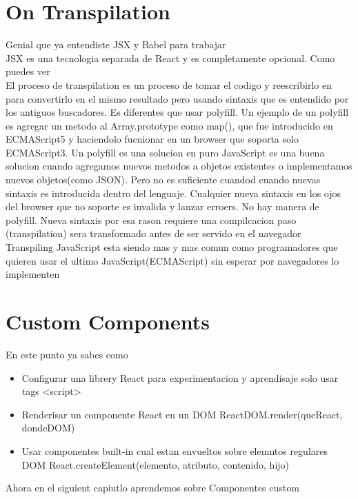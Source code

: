 \section{On Transpilation}
Genial que ya entendiste JSX y Babel para trabajar\\
JSX es una tecnologia separada de React y es completamente opcional. Como puedes ver\\
El proceso de transpilation es un proceso de tomar el codigo y reescribirlo en para convertirlo en el mismo resultado pero usando sintaxis que es entendido por los antiguos buscadores. Es diferentes que usar polyfill. Un ejemplo de un polyfill es agregar un metodo al Array.prototype como map(), que fue introducido en ECMAScript5 y haciendolo fucnionar en un browser que soporta solo ECMAScript3. Un polyfill es una solucion en puro JavaScript es una buena solucion cuando agregamos nuevos metodos a objetos existentes o implementamos nuevos objetos(como JSON). Pero no es suficiente cuandod cuando nuevas sintaxis es introducida dentro del lenguaje. Cualquier nueva sintaxis en los ojos del browser que no soporte es invalida y lanzar erroers. No hay manera de polyfill. Nueva sintaxis por esa rason requiere una compilcacion paso (transpilation) sera transformado antes de ser servido en el navegador\\
Transpiling JavaScript esta siendo mas y mas comun como programadores que quieren usar el ultimo JavaScript(ECMAScript) sin esperar por navegadores lo implementen
\section{Custom Components}
En este punto ya sabes como
\begin{itemize}
  \item Configurar una librery React para experimentacion y aprendisaje solo usar tags <script>
  \item Renderisar un componente React en un DOM  ReactDOM.render(queReact, dondeDOM)
  \item Usar componentes built-in cual estan envueltos sobre elemntos regulares DOM React.createElement(elemento, atributo, contenido, hijo)
\end{itemize}
Ahora en el siguient capiutlo aprendemos sobre Componentes custom
